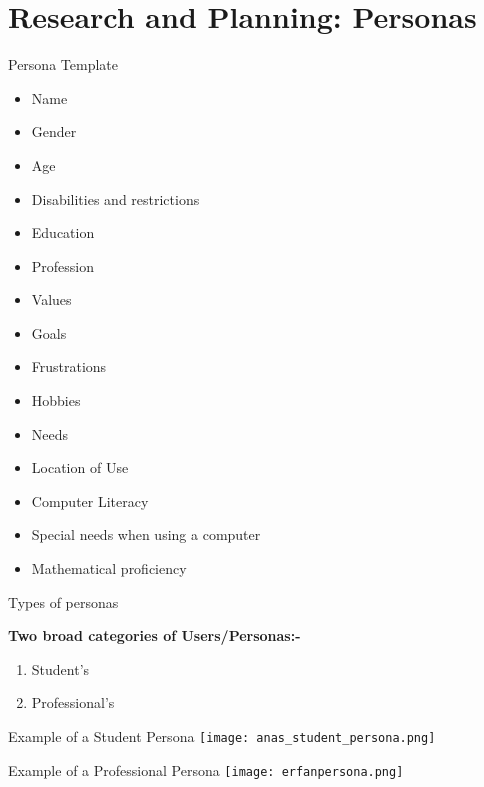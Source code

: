 \documentclass{beamer}
\begin{document}
\section{Research and Planning: Personas}


\begin{frame}{Persona Template}
    \begin{itemize}
		\item Name
		\item Gender
		\item Age
		\item Disabilities and restrictions
		\item Education
		\item Profession
		\item Values    
		\item Goals
		\item Frustrations
		\item Hobbies
		\item Needs
		\item Location of Use
		\item Computer Literacy
		\item Special needs when using a computer 
		\item Mathematical proficiency
	\end{itemize}
\end{frame}

\begin{frame}[fragile]{Types of personas}
  \item \textbf{Two broad categories of Users/Personas:-}
    \begin{enumerate}
   \item Student's
   \item Professional's
   \end{enumerate}
 
\end{frame}

\begin{frame}[fragile]{Example of a Student Persona}
	\vspace*{-6.5mm}    
    \hspace*{-13mm}
    \texttt{[image: anas\_student\_persona.png]}
\end{frame}

\begin{frame}[fragile]{Example of a Professional Persona}
	\vspace*{-3.5mm}    
    \hspace*{-11mm}
    \texttt{[image: erfanpersona.png]}
\end{frame}
\end{document}
